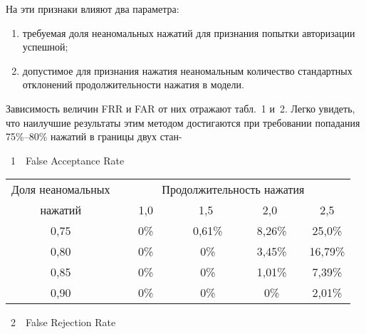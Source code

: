 \begin{multicols}{2}
На эти признаки влияют два параметра:
\begin{enumerate}[(1)]
\item требуемая доля неаномальных нажатий для признания попытки авторизации успешной;
\item %
допустимое для признания нажатия неаномальным количество стандартных отклонений продолжительности нажатия 
в модели.
\end{enumerate}
 Зависимость величин FRR и FAR от них отражают табл.~1 и~2.
Легко увидеть, что наилучшие результаты этим методом
достигаются при требовании попадания 75\%--80\% нажатий в границы двух
стан-\linebreak\vspace*{-12pt}
\begin{center}  %
{{\tablename~1}\ \ \small{False Acceptance Rate}}

\vspace*{6pt}



{\small
\tabcolsep=4.1pt
\begin{tabular}{|c|c|c|c|c|}
\hline
        Доля неаномальных   &\multicolumn{4}{c|}{ Продолжительность нажатия}\\
         \cline{2-5}
 нажатий& \ \ \ 1,0\ \ \  & \ \ \ 1,5 \ \ \  & \ \ \ 2,0 \ \ \   & 2,5     \\
                \hline
                0,75 & 0\% & 0,61\% & 8,26\% & 25,0\%\hphantom{9}  \\
                    0,80 & 0\% & 0\%\hphantom{9,9}    & 3,45\% & 16,79\% \\
                0,85 & 0\% & 0\%\hphantom{9,9}    & 1,01\% & \hphantom{9}7,39\%  \\
                0,90 & 0\% & 0\%\hphantom{9,9}    & 0\%\hphantom{,99}    & \hphantom{9}2,01\%  \\
                                \hline
                \end{tabular}

}

\vspace*{6pt}

{{\tablename~2}\ \ \small{False Rejection Rate}}


\end{center}
\end{multicols}

